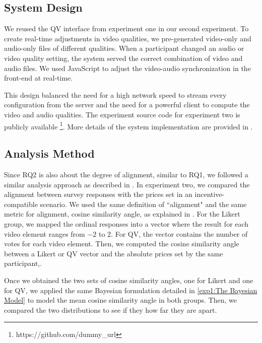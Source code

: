 \subsection{System Design}
We reused the QV interface from experiment one in our second experiment. To create real-time adjustments in video qualities, we pre-generated video-only and audio-only files of different qualities. When a participant changed an audio or video quality setting, the system served the correct combination of video and audio files. We used JavaScript to adjust the video-audio synchronization in the front-end at real-time.

This design balanced the need for a high network speed to stream every configuration from the server and the need for a powerful client to compute the video and audio qualities. The experiment source code for experiment two is publicly available \footnote{https://github.com/dummy\_url}. More details of the system implementation are provided in .

\subsection{Analysis Method}

Since RQ2 is also about the degree of alignment, similar to RQ1, we followed a similar analysis approach as described in . In experiment two, we compared the alignment between survey responses with the prices set in an incentive-compatible scenario. We used the same definition of ``alignment" and the same metric for alignment, cosine similarity angle, as explained in . For the Likert group, we mapped the ordinal responses into a vector where the result for each video element ranges from $-2$ to $2$. For QV, the vector contains the number of votes for each video element. Then, we computed the cosine similarity angle between a Likert or QV vector and the absolute prices set by the same participant,.

Once we obtained the two sets of cosine similarity angles, one for Likert and one for QV, we applied the same Bayesian formulation detailed in \cref{exp1:The Bayesian Model} to model the mean cosine similarity angle in both groups. Then, we compared the two distributions to see if they how far they are apart.